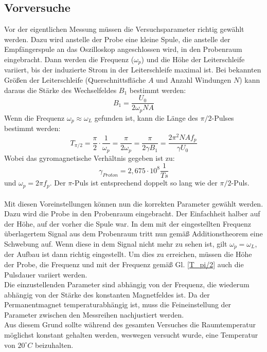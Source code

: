 \documentclass[12pt,a4paper]{article}
\begin{document}
\subsection{Vorversuche}
Vor der eigentlichen Messung müssen die Versuchsparameter richtig gewählt werden. Dazu wird anstelle der Probe eine kleine Spule, die anstelle der Empfängerspule an das Oszilloskop angeschlossen wird, in den Probenraum eingebracht. Dann werden die Frequenz ($\omega _p$) und die Höhe der Leiterschleife variiert, bis der induzierte Strom in der Leiterschleife maximal ist. Bei bekannten Größen der Leiterschleife (Querschnittsfläche $A$ und Anzahl Windungen $N$) kann daraus die Stärke des Wechselfeldes $B_1$ bestimmt werden:
\begin{equation}
\label{B1}
B_1 = \dfrac{U_0}{2 \omega _p N A}
\end{equation}
Wenn die Frequenz $\omega _p \approx \omega _L$ gefunden ist, kann die Länge des $\pi /2$-Pulses bestimmt werden:
\begin{equation}
\label{T_pi/2}
T_{\pi /2} = \dfrac{\pi}{2} \cdot \dfrac{1}{\omega _p} = \dfrac{\pi}{2 \omega _p} = \dfrac{\pi}{2 \gamma B_1} = \dfrac{2 \pi^2 N A f_p}{\gamma U_0}
\end{equation}
Wobei das gyromagnetische Verhältnis gegeben ist zu:
\begin{equation*}
\gamma _{Proton} = 2,675 \cdot 10^{8} \dfrac{1}{T s} 
\end{equation*}
und $\omega_p = 2 \pi f_p$.
Der $\pi$-Puls ist entsprechend doppelt so lang wie der $\pi /2$-Puls.\\
\\
Mit diesen Voreinstellungen können nun die korrekten Parameter gewählt werden. Dazu wird die Probe in den Probenraum eingebracht. Der Einfachheit halber auf der Höhe, auf der vorher die Spule war. In dem mit der eingestellten Frequenz überlagertem Signal aus dem Probenraum tritt nun gemäß Additionstheorem eine Schwebung auf. Wenn diese in dem Signal nicht mehr zu sehen ist, gilt $\omega _p = \omega _L$, der Aufbau ist dann richtig eingestellt. Um dies zu erreichen, müssen die Höhe der Probe, die Frequenz und mit der Frequenz gemäß Gl. \ref{T_pi/2} auch die Pulsdauer variiert werden.\\
Die einzustellenden Parameter sind abhängig von der Frequenz, die wiederum abhängig von der Stärke des konstanten Magnetfeldes ist. Da der Permanentmagnet temperaturabhängig ist, muss die Feineinstellung der Parameter zwischen den Messreihen nachjustiert werden. \\
Aus diesem Grund sollte während des gesamten Versuches die Raumtemperatur möglichst konstant gehalten werden, weswegen versucht wurde, eine Temperatur von $20^{\circ}C$ beizuhalten.
\end{document}
